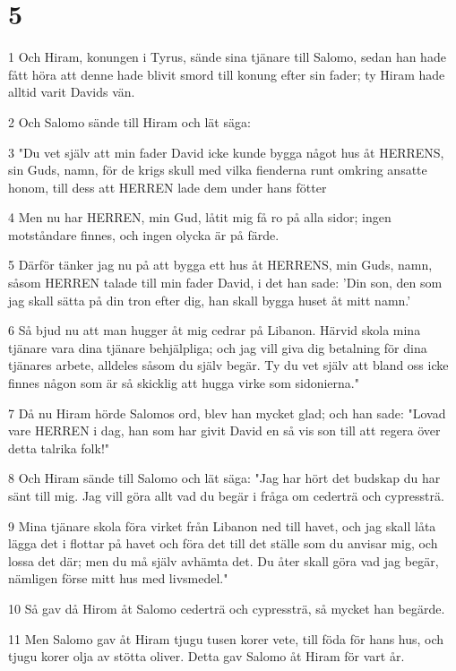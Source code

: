 \chapter{5}

\par 1 Och Hiram, konungen i Tyrus, sände sina tjänare till Salomo, sedan han hade fått höra att denne hade blivit smord till konung efter sin fader; ty Hiram hade alltid varit Davids vän.
\par 2 Och Salomo sände till Hiram och lät säga:
\par 3 "Du vet själv att min fader David icke kunde bygga något hus åt HERRENS, sin Guds, namn, för de krigs skull med vilka fienderna runt omkring ansatte honom, till dess att HERREN lade dem under hans fötter
\par 4 Men nu har HERREN, min Gud, låtit mig få ro på alla sidor; ingen motståndare finnes, och ingen olycka är på färde.
\par 5 Därför tänker jag nu på att bygga ett hus åt HERRENS, min Guds, namn, såsom HERREN talade till min fader David, i det han sade: 'Din son, den som jag skall sätta på din tron efter dig, han skall bygga huset åt mitt namn.'
\par 6 Så bjud nu att man hugger åt mig cedrar på Libanon. Härvid skola mina tjänare vara dina tjänare behjälpliga; och jag vill giva dig betalning för dina tjänares arbete, alldeles såsom du själv begär. Ty du vet själv att bland oss icke finnes någon som är så skicklig att hugga virke som sidonierna."
\par 7 Då nu Hiram hörde Salomos ord, blev han mycket glad; och han sade: "Lovad vare HERREN i dag, han som har givit David en så vis son till att regera över detta talrika folk!"
\par 8 Och Hiram sände till Salomo och lät säga: "Jag har hört det budskap du har sänt till mig. Jag vill göra allt vad du begär i fråga om cederträ och cypressträ.
\par 9 Mina tjänare skola föra virket från Libanon ned till havet, och jag skall låta lägga det i flottar på havet och föra det till det ställe som du anvisar mig, och lossa det där; men du må själv avhämta det. Du åter skall göra vad jag begär, nämligen förse mitt hus med livsmedel."
\par 10 Så gav då Hirom åt Salomo cederträ och cypressträ, så mycket han begärde.
\par 11 Men Salomo gav åt Hiram tjugu tusen korer vete, till föda för hans hus, och tjugu korer olja av stötta oliver. Detta gav Salomo åt Hiram för vart år.
